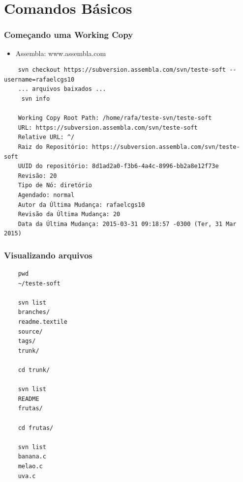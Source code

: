 \documentclass{beamer}
\begin{document}
\section{Comandos B\'asicos}

\begin{frame}[fragile]
    \frametitle{Come\c{c}ando uma Working Copy}
    \begin{itemize}
        \item Assembla: www.assembla.com
    \end{itemize}


    \begin{bash}{}
        {\tiny
    \begin{verbatim}
    svn checkout https://subversion.assembla.com/svn/teste-soft --username=rafaelcgs10
    ... arquivos baixados ...
     svn info

    Working Copy Root Path: /home/rafa/teste-svn/teste-soft
    URL: https://subversion.assembla.com/svn/teste-soft
    Relative URL: ^/
    Raiz do Repositório: https://subversion.assembla.com/svn/teste-soft
    UUID do repositório: 8d1ad2a0-f3b6-4a4c-8996-bb2a8e12f73e
    Revisão: 20
    Tipo de Nó: diretório
    Agendado: normal
    Autor da Última Mudança: rafaelcgs10
    Revisão da Última Mudança: 20
    Data da Última Mudança: 2015-03-31 09:18:57 -0300 (Ter, 31 Mar 2015)
    \end{verbatim}
    }
    \end{bash}

\end{frame}

\begin{frame}[fragile]
    \frametitle{Visualizando arquivos}

    \begin{bash}{}
    {\tiny
    \begin{verbatim}
    pwd
    ~/teste-soft

    svn list
    branches/
    readme.textile
    source/
    tags/
    trunk/

    cd trunk/

    svn list
    README
    frutas/

    cd frutas/

    svn list
    banana.c
    melao.c
    uva.c
    \end{verbatim}
    }
    \end{bash}

\end{frame}
\end{document}
